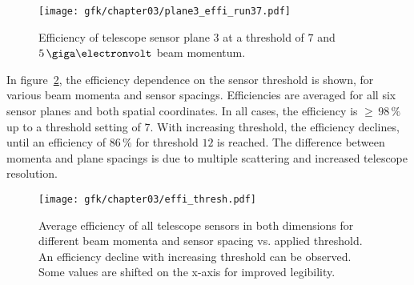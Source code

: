 \begin{figure}[hbtp]
\centering
\texttt{[image: gfk/chapter03/plane3\_effi\_run37.pdf]}
\caption[Telescope sensor efficiency]{Efficiency of telescope sensor plane $3$
at a threshold of $7$ and $5\,\giga\electronvolt$ beam momentum.}
\label{fig:effi}
\end{figure}

In figure~\ref{fig:effi_thresh}, the efficiency dependence on the sensor
threshold is shown, for various beam momenta and sensor spacings. Efficiencies
are averaged for all six sensor planes and both spatial coordinates. In all
cases, the efficiency is $\ge\,98\,\%$ up to a threshold setting of 7. With
increasing threshold, the efficiency declines, until an efficiency of $86\,\%$
for threshold $12$ is reached. The difference between momenta and plane spacings
is due to multiple scattering and increased telescope resolution.\\

\begin{figure}[hbtp]
\centering
\texttt{[image: gfk/chapter03/effi\_thresh.pdf]}
\caption[Overall telescope sensor efficiency vs. threshold for different beam
momenta and sensor spacings]{Average efficiency of all telescope sensors in both
dimensions for different beam momenta and sensor spacing vs. applied threshold.
An efficiency decline with increasing threshold can be observed. Some values are
shifted on the x-axis for improved legibility.}
\label{fig:effi_thresh}
\end{figure}

